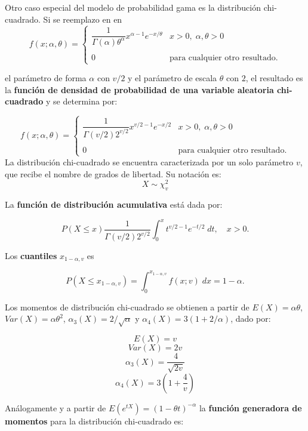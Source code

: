 Otro caso especial del modelo de probabilidad gama es la distribución chi-cuadrado. Si se reemplazo en en 
	$$f(x;\alpha,\theta)=\left\{\begin{array}{ll}
		\dfrac{1}{\Gamma(\alpha)\theta^\alpha}x^{\alpha-1}e^{-x/\theta} & x>0,\; \alpha,\theta>0\\\\
		0 & \mbox{para cualquier otro resultado.}
	\end{array}\right.$$

el parámetro de forma $\alpha$ con $v/2$ y el parámetro de escala $\theta$ con $2$, el resultado es la \textbf{función de densidad de probabilidad de una variable aleatoria chi-cuadrado} y se determina por:
\begin{tcolorbox}
	$$f(x;\alpha,\theta)=\left\{\begin{array}{ll}
		\dfrac{1}{\Gamma(v/2)2^{v/2}}x^{v/2-1}e^{-x/2} & x>0,\; \alpha,\theta>0\\\\
		0 & \mbox{para cualquier otro resultado.}
	\end{array}\right.$$
	La distribución chi-cuadrado se encuentra caracterizada por un solo parámetro $v$, que recibe el nombre de grados de libertad. Su notación es:
	$$X\sim \chi^2_v$$
\end{tcolorbox}

La \textbf{función de distribución acumulativa} está dada por:

\begin{tcolorbox}
    $$P(X\leq x)\dfrac{1}{\Gamma(v/2)2^{v/2}}\int_0^x t^{v/2-1}e^{-t/2}\; dt, \quad x>0.$$
\end{tcolorbox}

Los \textbf{cuantiles} $x_{1-\alpha,v}$ es

\begin{tcolorbox}
    $$P(X\leq x_{1-\alpha,v})=\int_0^{x_{1-\alpha,v}}f(x;v)\; dx=1-\alpha.$$
\end{tcolorbox}

Los momentos de distribución chi-cuadrado se obtienen a partir de $E(X)=\alpha \theta$, $Var(X)=\alpha\theta^2$, $\alpha_3(X)=2/\sqrt{\alpha}$ y $\alpha_4(X)=3\left(1+2/\alpha\right)$, dado por:

\begin{tcolorbox}
    $$E(X)=v$$
    $$Var(X)=2v$$
    $$\alpha_3(X)=\dfrac{4}{\sqrt{2v}}$$
    $$\alpha_4(X)=3\left(1+\dfrac{4}{v}\right)$$
\end{tcolorbox}

Análogamente y a partir de $E(e^{tX})=(1-\theta t)^{-\alpha}$ la \textbf{función generadora de momentos} para la distribución chi-cuadrado es:

